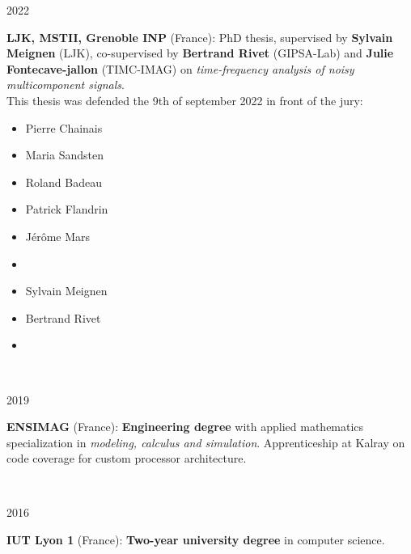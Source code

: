 \documentclass[a4paper,10pt]{article}
\begin{document}
	\noindent
	\begin{minipage}{0.20\textwidth}
		\color{MyGray} 2022
	\end{minipage}
	\hfill
	\begin{minipage}{0.70\textwidth}
		\textbf{LJK, MSTII, Grenoble INP} (France): PhD thesis, supervised by \textbf{Sylvain Meignen} (LJK), co-supervised by \textbf{Bertrand Rivet} (GIPSA-Lab) and \textbf{Julie Fontecave-jallon} (TIMC-IMAG) on \emph{time-frequency analysis of noisy multicomponent signals}.\\
		This thesis was defended the 9th of september 2022 in front of the jury:
		\begin{multicols}{3}
			\begin{itemize}
				\item[] Pierre Chainais
				\item[] Maria Sandsten
				\item[] Roland Badeau
			\end{itemize}
			\columnbreak
			\begin{itemize}
				\item[] Patrick Flandrin
				\item[] Jérôme Mars
				\item[] 
			\end{itemize}
			\columnbreak
			\begin{itemize}
				\item[] Sylvain Meignen
				\item[] Bertrand Rivet
				\item[] 
			\end{itemize}
		\end{multicols}
	\end{minipage}\\
	\vspace{2mm}
	
	\noindent
	\begin{minipage}{0.20\textwidth}
		\color{MyGray} 2019
	\end{minipage}
	\hfill
	\begin{minipage}{0.70\textwidth}
		\textbf{ENSIMAG} (France): \textbf{Engineering degree} with applied mathematics specialization in \emph{modeling, calculus and simulation}. Apprenticeship at Kalray on code coverage for custom processor architecture.
	\end{minipage}\\
	\vspace{2mm}
	
	\noindent
	\begin{minipage}{0.20\textwidth}
		\color{MyGray} 2016
	\end{minipage}
	\hfill
	\begin{minipage}{0.70\textwidth}
		\textbf{IUT Lyon 1} (France): \textbf{Two-year university degree} in computer science.
	\end{minipage}\\
	\vspace{2mm}
	
\end{document}
